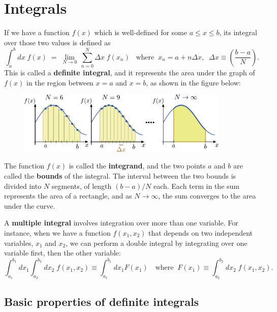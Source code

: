 \documentclass[10pt,a4paper]{article}
\begin{document}
\setcounter{page}{13}
    
\section{Integrals}
\label{integrals}

If we have a function $f(x)$ which is well-defined for some $a \le x
\le b$, its integral over those two values is defined as
\begin{equation}
\int_a^b dx\; f(x) \;=\; \lim_{N \rightarrow 0} \, \sum_{n=0}^{N} \Delta x\; f(x_n) \;\;\;\mathrm{where}\;\; x_n = a + n\Delta x, \;\; \Delta x \equiv \left(\frac{b-a}{N}\right).
\end{equation}
This is called a \textbf{definite integral}, and it represents the
area under the graph of $f(x)$ in the region between $x=a$ and $x=b$,
as shown in the figure below:

\begin{figure}[h]
  \centering\includegraphics[width=0.9\textwidth]{definite_integral}
\end{figure}

The function $f(x)$ is called the \textbf{integrand}, and the two
points $a$ and $b$ are called the \textbf{bounds} of the integral. The
interval between the two bounds is divided into $N$ segments, of
length $(b-a)/N$ each. Each term in the sum represents the area of a
rectangle, and as $N\rightarrow \infty$, the sum converges to the area
under the curve.

A \textbf{multiple integral} involves integration over more than one
variable. For instance, when we have a function $f(x_1,x_2)$ that
depends on two independent variables, $x_1$ and $x_2$, we can
perform a double integral by integrating over one variable first, then
the other variable:
\begin{equation}
\int_{a_1}^{b_1} dx_1 \int_{a_2}^{b_2} dx_2 \; f(x_1, x_2) \equiv \int_{a_1}^{b_1} dx_1 F(x_1)\quad\text{where}\;\;F(x_1) \equiv \int_{a_2}^{b_2} dx_2 \; f(x_1, x_2).
\end{equation}
    \hypertarget{basic-properties-of-definite-integrals}{%
\subsection{Basic properties of definite
integrals}\label{basic-properties-of-definite-integrals}}
\end{document}
